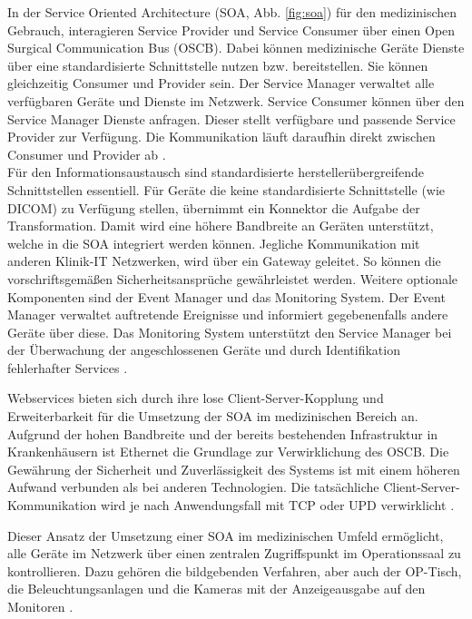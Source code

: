 In der Service Oriented Architecture (SOA, Abb. \ref{fig:soa}) für den medizinischen Gebrauch, interagieren Service Provider und Service Consumer über einen Open Surgical Communication Bus (OSCB). Dabei können medizinische Geräte Dienste über eine standardisierte Schnittstelle nutzen bzw. bereitstellen. Sie können gleichzeitig Consumer und Provider sein. Der Service Manager verwaltet alle verfügbaren Geräte und Dienste im Netzwerk. Service Consumer können über den Service Manager Dienste anfragen. Dieser stellt verfügbare und passende Service Provider zur Verfügung. Die Kommunikation läuft daraufhin direkt zwischen Consumer und Provider ab \cite{DerDigitaleOperationssaal}. \\ 
Für den Informationsaustausch sind standardisierte herstellerübergreifende Schnittstellen essentiell. Für Geräte die keine standardisierte Schnittstelle (wie DICOM) zu Verfügung stellen, übernimmt ein Konnektor die Aufgabe der Transformation. Damit wird eine höhere Bandbreite an Geräten unterstützt, welche in die SOA integriert werden können. Jegliche Kommunikation mit anderen Klinik-IT Netzwerken, wird über ein Gateway geleitet. So können die vorschriftsgemäßen Sicherheitsansprüche gewährleistet werden. Weitere optionale Komponenten sind der Event Manager und das Monitoring System. Der Event Manager verwaltet auftretende Ereignisse und informiert gegebenenfalls andere Geräte über diese. Das Monitoring System unterstützt den Service Manager bei der Überwachung der angeschlossenen Geräte und durch Identifikation fehlerhafter Services \cite{DerDigitaleOperationssaal}.

Webservices bieten sich durch ihre lose Client-Server-Kopplung und Erweiterbarkeit für die Umsetzung der SOA im medizinischen Bereich an. Aufgrund der hohen Bandbreite und der bereits bestehenden Infrastruktur in Krankenhäusern ist Ethernet die Grundlage zur Verwirklichung des OSCB. Die Gewährung der Sicherheit und Zuverlässigkeit des Systems ist mit einem höheren Aufwand verbunden als bei anderen Technologien. Die tatsächliche Client-Server-Kommunikation wird je nach Anwendungsfall mit TCP oder UPD verwirklicht \cite{DerDigitaleOperationssaal}.

Dieser Ansatz der Umsetzung einer SOA im medizinischen Umfeld ermöglicht, alle Geräte im Netzwerk über einen zentralen Zugriffspunkt im Operationssaal zu kontrollieren. Dazu gehören die bildgebenden Verfahren, aber auch der OP-Tisch, die Beleuchtungsanlagen und die Kameras mit der Anzeigeausgabe auf den Monitoren \cite{DerDigitaleOperationssaal}.

